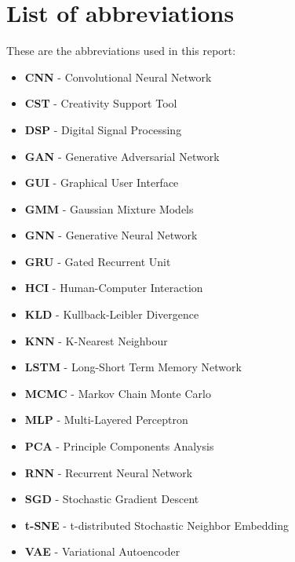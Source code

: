 \chapter*{List of abbreviations}

These are the abbreviations used in this report: 
\begin{itemize}
\item \textbf{CNN} - Convolutional Neural Network
\item \textbf{CST} - Creativity Support Tool
\item \textbf{DSP} - Digital Signal Processing
\item \textbf{GAN} - Generative Adversarial Network
\item \textbf{GUI} - Graphical User Interface
\item \textbf{GMM} - Gaussian Mixture Models
\item \textbf{GNN} - Generative Neural Network
\item \textbf{GRU} - Gated Recurrent Unit
\item \textbf{HCI} - Human-Computer Interaction
\item \textbf{KLD} - Kullback-Leibler Divergence
\item \textbf{KNN} - K-Nearest Neighbour
\item \textbf{LSTM} - Long-Short Term Memory Network
\item \textbf{MCMC} - Markov Chain Monte Carlo
\item \textbf{MLP} - Multi-Layered Perceptron
\item \textbf{PCA} - Principle Components Analysis
\item \textbf{RNN} - Recurrent Neural Network
\item \textbf{SGD} - Stochastic Gradient Descent
\item \textbf{t-SNE} - t-distributed Stochastic Neighbor Embedding
\item \textbf{VAE} - Variational Autoencoder
\end{itemize}